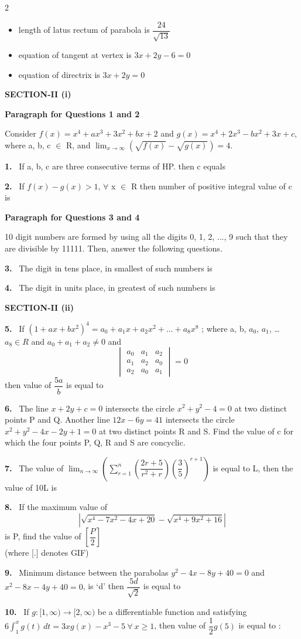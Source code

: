 \documentclass[10pt]{extarticle}
\newcommand{\sect}[1]{\par\smallskip\noindent\textbf{#1}\par}
\newcommand{\qn}[1]{\par\smallskip\noindent\textbf{#1.}~}
\newcommand{\paraq}[2]{\par\smallskip\noindent\textbf{Paragraph for Questions #1 and #2}\par}
\newenvironment{qoptions}{\begin{itemize}[leftmargin=1.8em,itemsep=1pt,topsep=2pt,label={}]}{\end{itemize}}
\newcommand{\opt}[2]{\item[(#1)] #2}
\begin{document}
\begin{multicols}{2}
\begin{qoptions}
\opt{B}{length of latus rectum of parabola is $\dfrac{24}{\sqrt{13}}$}
\opt{C}{equation of tangent at vertex is $3x+2y-6=0$}
\opt{D}{equation of directrix is $3x+2y=0$}
\end{qoptions}
\sect{SECTION-II (i)}
\paraq{1}{2}
Consider $f(x)=x^4+ax^3+3x^2+bx+2$ and $g(x)=x^4+2x^3-bx^2+3x+c$, where a, b, c $\in$ R, and $\displaystyle\lim_{x\to\infty}\left(\sqrt{f(x)}-\sqrt{g(x)}\right)=4$.
\qn{1} If a, b, c are three consecutive terms of HP. then c equals
\qn{2} If $f(x)-g(x)>1$, $\forall$ x $\in$ R then number of positive integral value of c is
\paraq{3}{4}
10 digit numbers are formed by using all the digits 0, 1, 2, ..., 9 such that they are divisible by 11111. Then, answer the following questions.
\qn{3} The digit in tens place, in smallest of such numbers is
\qn{4} The digit in units place, in greatest of such numbers is
\sect{SECTION-II (ii)}
\qn{5} If $(1+ax+bx^2)^4=a_0+a_1x+a_2x^2+\ldots+a_8x^8$ ; where a, b, $a_0$, $a_1$, \ldots\ $a_8\in R$ and $a_0+a_1+a_2\ne0$ and
\[\begin{vmatrix}a_0&a_1&a_2\\a_1&a_2&a_0\\a_2&a_0&a_1\end{vmatrix}=0\]
then value of $\dfrac{5a}{b}$ is equal to
\qn{6} The line $x+2y+c=0$ intersects the circle $x^2+y^2-4=0$ at two distinct points P and Q. Another line $12x-6y=41$ intersects the circle $x^2+y^2-4x-2y+1=0$ at two distinct points R and S. Find the value of c for which the four points P, Q, R and S are concyclic.
\qn{7} The value of $\displaystyle\lim_{n\to\infty}\left(\sum_{r=1}^{n}\left(\dfrac{2r+5}{r^2+r}\right)\left(\dfrac{3}{5}\right)^{r+1}\right)$ is equal to L, then the value of 10L is
\qn{8} If the maximum value of
\[\left|\sqrt{x^4-7x^2-4x+20}-\sqrt{x^4+9x^2+16}\right|\]
is P, find the value of $\left[\dfrac{P}{2}\right]$\\
(where [.] denotes GIF)
\qn{9} Minimum distance between the parabolas $y^2-4x-8y+40=0$ and $x^2-8x-4y+40=0$, is `d' then $\dfrac{5d}{\sqrt2}$ is equal to
\qn{10} If $g:[1,\infty)\to[2,\infty)$ be a differentiable function and satisfying $6\displaystyle\int_1^x g(t)\,dt=3xg(x)-x^3-5\ \forall\ x\ge1$, then value of $\dfrac12 g(5)$ is equal to :
\end{multicols}
\end{document}

